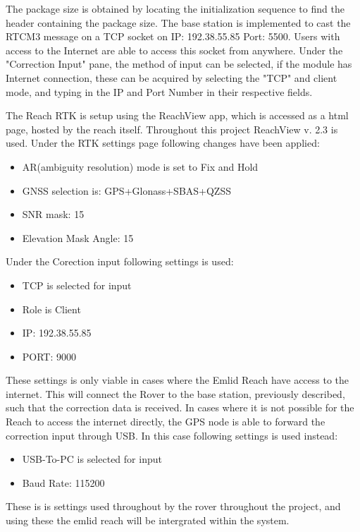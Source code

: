 The package size is obtained by locating the initialization sequence to find the header containing the package size. The base station is implemented to cast the RTCM3 message on a TCP socket on IP: 192.38.55.85 Port: 5500. Users with access to the Internet are able to access this socket from anywhere. Under the "Correction Input" pane, the method of input can be selected, if the module has Internet connection, these can be acquired by selecting the "TCP" and client mode, and typing in the IP and Port Number in their respective fields.

The Reach RTK is setup using the ReachView app, which is accessed as a html page, hosted by the reach itself. 
Throughout this project ReachView v. 2.3 is used.
Under the RTK settings page following changes have been applied:
	\begin{itemize}
		\item AR(ambiguity resolution) mode is set to Fix and Hold
		\item GNSS selection is: GPS+Glonass+SBAS+QZSS
		\item SNR mask: 15
		\item Elevation Mask Angle: 15
	\end{itemize}
Under the Corection input following settings is used: 
	\begin{itemize}
		\item TCP is selected for input
		\item Role is Client
		\item IP: 192.38.55.85
		\item PORT: 9000
	\end{itemize}
These settings is only viable in cases where the Emlid Reach have access to the internet.
This will connect the Rover to the base station, previously described, such that the correction data is received. 
In cases where it is not possible for the Reach to access the internet directly, the GPS node is able to forward the correction input through USB. 
In this case following settings is used instead: 
	\begin{itemize}
		\item USB-To-PC is selected for input
		\item Baud Rate: 115200
	\end{itemize}
These is is settings used throughout by the rover throughout the project, and using these the emlid reach will be intergrated within the system.





